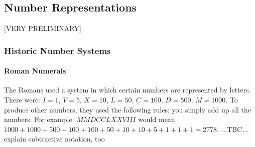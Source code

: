 



\subsection{Number Representations} [VERY PRELIMINARY]

\subsubsection{Historic Number Systems}

\paragraph{Roman Numerals}
The Romans used a system in which certain numbers are represented by letters. There were: $I=1$, $V=5$, $X=10$, $L=50$, $C=100$, $D=500$, $M=1000$. To produce other numbers, they used the following rules: you simply add up all the numbers. For example: $MMDCCLXXVIII$ would mean $1000+1000+500+100+100+50+10+10+5+1+1+1 = 2778$. ...TBC... explain subtractive notation, too








